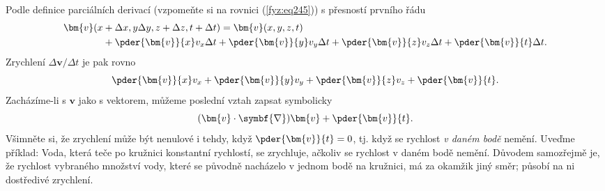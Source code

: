     Podle definice parciálních derivací (vzpomeňte si na rovnici (\ref{fyz:eq245})) s přesností 
    prvního řádu
    \begin{align*}
      \bm{v}(%
       x&+ \Delta x, y \Delta y, z + \Delta z, t + \Delta t) 
         = \bm{v}(x, y, z, t)                                                                \\
        &+ \pder{\bm{v}}{x}v_x\Delta t + \pder{\bm{v}}{y}v_y\Delta t + \pder{\bm{v}}{z}v_z\Delta t
         + \pder{\bm{v}}{t}\Delta t.
    \end{align*}
    Zrychlení \(\Delta{\bm{v}}/\Delta{t}\) je pak rovno
    \begin{equation*}
      \pder{\bm{v}}{x}v_x + \pder{\bm{v}}{y}v_y + \pder{\bm{v}}{z}v_z + \pder{\bm{v}}{t}.
    \end{equation*}
    Zacházíme-li s \(\bm{v}\) jako s vektorem, můžeme poslední vztah zapsat symbolicky
    \begin{equation}\label{fyz:eq550}
      (\bm{v}\cdot\symbf{\nabla})\bm{v} + \pder{\bm{v}}{t}.
    \end{equation}
    Všimněte si, že zrychlení může být nenulové i tehdy, když \(\pder{\bm{v}}{t} = 0\), tj. když se 
    rychlost \emph{v daném bodě} nemění. Uveďme příklad: Voda, která teče po kružnici konstantní 
    rychlostí, se zrychluje, ačkoliv se rychlost v daném bodě nemění. Důvodem samozřejmě je, že 
    rychlost vybraného množství vody, které se původně nacházelo v jednom bodě na kružnici, má za 
    okamžik jiný směr; působí na ni dostředivé zrychlení. 
    
